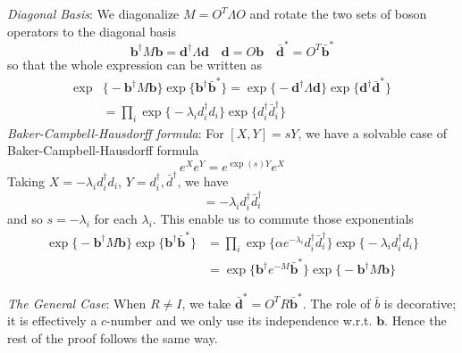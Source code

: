 \documentclass{article}
\renewcommand{\vec}[1]{\boldsymbol{\mathbf{#1}}}
\begin{document}
{\it Diagonal Basis}: We diagonalize $M = O^{T} \Lambda O $ and rotate the two sets of boson operators to the diagonal basis
\begin{equation}
  \vec{b}^{\dagger}  M \vec{b} = \vec{d}^{\dagger} \Lambda \vec{d}  \quad \vec{d} = O \vec{b} \quad \vec{\bar{d}}^{*} = O^T \vec{\bar{b}}^{*}
\end{equation}
so that the whole expression can be written as
\begin{equation}
\begin{aligned}
  \exp&\Big\{- \vec{b}^{\dagger} M \vec{b}  \Big\} \exp \Big\{ \vec{b}^{\dagger} \bar{\vec{b}}^{*}  \Big\}  =  
  \exp\Big\{- \vec{d}^{\dagger} \Lambda \vec{d}  \Big\} \exp \Big\{   \vec{d}^{\dagger} \bar{\vec{d}}^{*}  \Big\} \\
& = \prod_i  \exp\Big\{- \lambda_i d_i^{\dagger} d_i  \Big\} \exp \Big\{  d_i^{\dagger} \bar{d}_i ^{\dagger}  \Big\}
\end{aligned}
\end{equation}
{\it Baker-Campbell-Hausdorff formula}: For $ [X, Y] = sY $, we have a solvable case of Baker-Campbell-Hausdorff formula
\begin{equation}
  e^X e^{Y} = e^{\exp (s ) Y} e^{X}
\end{equation}
Taking $X = -\lambda_i d_i^{\dagger} d_i$, $Y = d_i^{\dagger}, \bar{d}^{\dagger}$, we have
\begin{equation}
[- \lambda_i d_i^{\dagger} d_i, d_i ^{\dagger} \bar{d}_i^{\dagger}] =  - \lambda_i  d_i ^{\dagger} \bar{d}_i^{\dagger} 
\end{equation}
and so $s = - \lambda_i$ for each $\lambda_i$. This enable us to commute those exponentials
\begin{equation}
\begin{aligned}
 \exp\Big\{- \vec{b}^{\dagger} M \vec{b}  \Big\} \exp \Big\{  \vec{b}^{\dagger} \bar{\vec{b}}^{*}  \Big\}   &= \prod_i \exp \Big\{ \alpha e^{- \lambda_i }  d^{\dagger}_i \bar{d}^{\dagger}_i  \Big\}  \exp \Big\{-\lambda_i  d^{\dagger}_i d_i  \Big\} \\
 & = \exp \Big\{ \vec{b}^{\dagger} e^{-M}  \bar{\vec{b}}^{*}  \Big\} \exp\Big\{- \vec{b}^{\dagger} M \vec{b}  \Big\} 
\end{aligned}
\end{equation}

{\it The General Case}: When $R \ne I$, we take $\vec{\bar{d}}^* = O^T R \vec{\bar{b}}^*$. The role of $\bar{b}$ is decorative; it is effectively a $c$-number and we only use its independence w.r.t. $\vec{b}$. Hence the rest of the proof follows the same way. 
\end{document}
